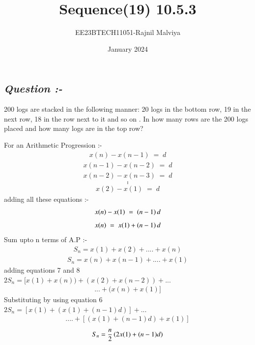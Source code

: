 \documentclass[journal,12pt,twocolumn]{IEEEtran}
\theoremstyle{remark}
\begin{document}
\title{Sequence(19) 10.5.3}
\author{EE23BTECH11051-Rajnil Malviya}
\date{January 2024}
\maketitle
\subsection*{\textit{Question :-}}
200 logs are stacked in the following manner: 20 logs in the bottom row, 19 in the next row,
18 in the row next to it and so on . In how many rows are the 200 logs placed
and how many logs are in the top row?
\begin{table}[h!]
   
        
       
    \end{table}


For an Arithmetic Progression :-
\begin{align}x(n)-x(n-1) \; = \; d \end{align}
\begin{align}x(n-1)-x(n-2) \; = \; d \end{align}
\begin{align}x(n-2)-x(n-3) \; = \; d \end{align}
$$.$$
$$.$$
$$.$$
\begin{align}x(2)-x(1) \; = \; d \end{align}
adding all these equations :-
\begin{align}x(n)-x(1) \; = \; \left(n-1\right) d \end{align}
\begin{align}x(n) \; = \; x(1)+\left(n-1\right) d \end{align}
Sum upto n terms of A.P :-
\begin{align}S_n=x(1)+x(2)+....+x(n)\end{align}
\begin{align}S_n=x(n)+x(n-1)+....+x(1)\end{align}
adding equations 7 and 8 \\
$2 S_n=[x(1)+x(n))+(x(2)+x(n-2))+...$\\\begin{align}...+(x(n)+x(1)]\end{align}
Substituting by using equation 6 \\
$2 S_n=[x(1)+(x(1) +(n-1) d)]+ ...$
\begin{align}....+[(x(1) + (n-1) d) + x(1)]\end{align}
\begin{align}S_n=\frac{n}{2}\left(2x(1) + (n-1) d\right)\end{align}
\end{document}
